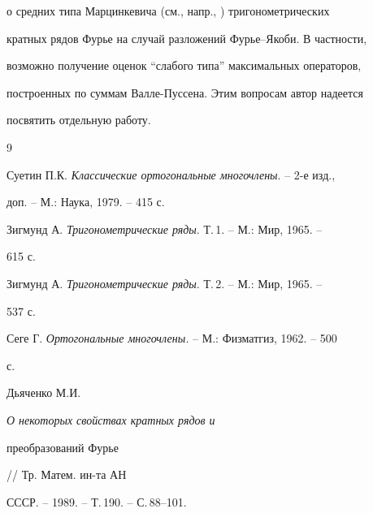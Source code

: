 о средних типа Марцинкевича (см., напр.,  \cite{5}) тригонометрических 


кратных рядов Фурье на случай разложений Фурье--Якоби. В частности, 


возможно получение оценок ``слабого типа'' максимальных операторов, 


построенных по суммам Валле-Пуссена. Этим вопросам автор надеется 


посвятить отдельную работу. 


 


\begin{thebibliography}{9} 


 




Суетин П.К. {\em Классические ортогональные многочлены}. -- 2-е изд., 


доп. -- М.: Наука, 1979. -- 415 с. 




Зигмунд А. {\em Тригонометрические ряды}. Т.\,1. -- М.: Мир, 1965. -- 


615 с. 




Зигмунд А. {\em Тригонометрические ряды}. Т.\,2. -- М.: Мир, 1965. -- 


537 с. 




Сеге Г. {\em Ортогональные многочлены.} -- М.: Физматгиз, 1962. -- 500 


с. 




Дьяченко М.И. {\em О некоторых свойствах кратных рядов и 


преобразований Фурье} // Тр. Матем. ин-та АН 


СССР. -- 1989. -- Т.\,190. -- С.\,88--101. 


 


\end{thebibliography} 


 


\vskip 2cm 


 






 


\label{end} 


 


 


 


